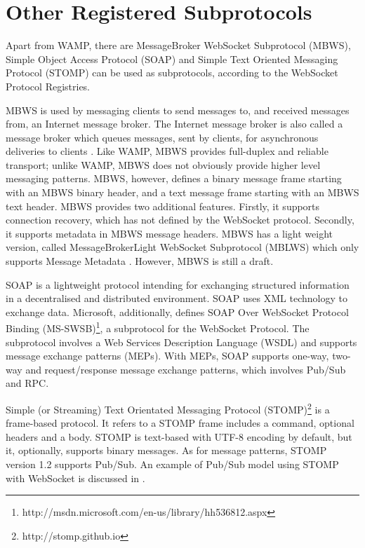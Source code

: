 \section{Other Registered Subprotocols}

Apart from WAMP, there are MessageBroker WebSocket Subprotocol (MBWS), Simple Object Access Protocol (SOAP) and Simple Text Oriented Messaging Protocol (STOMP) can be used as subprotocols, according to the WebSocket Protocol Registries.

MBWS is used by messaging clients to send messages to, and received messages from, an Internet message broker. The Internet message broker is also called a message broker which queues messages, sent by clients, for asynchronous deliveries to clients \cite{hapner2012messagebroker}. Like WAMP, MBWS provides full-duplex and reliable transport; unlike WAMP, MBWS does not obviously provide higher level messaging patterns. MBWS, however, defines a binary message frame starting with an MBWS binary header, and a text message frame starting with an MBWS text header. MBWS provides two additional features. Firstly, it supports connection recovery, which has not defined by the WebSocket protocol. Secondly, it supports metadata in MBWS message headers. MBWS has a light weight version, called MessageBrokerLight WebSocket Subprotocol (MBLWS) which only supports Message Metadata \cite{hapner2012messagebroker}. However, MBWS is still a draft. 

SOAP is a lightweight protocol intending for exchanging structured information in a decentralised and distributed environment. SOAP uses XML technology to exchange data\cite{gudginsoap}. Microsoft, additionally, defines SOAP Over WebSocket Protocol Binding (MS-SWSB)\footnote{http://msdn.microsoft.com/en-us/library/hh536812.aspx}, a subprotocol for the WebSocket Protocol. The subprotocol involves a Web Services Description Language (WSDL) and supports message exchange patterns (MEPs). With MEPs, SOAP supports one-way, two-way and request/response message exchange patterns, which involves Pub/Sub and RPC.

Simple (or Streaming) Text Orientated Messaging Protocol (STOMP)\footnote{http://stomp.github.io} is a frame-based protocol. It refers to a STOMP frame includes a command, optional headers and a body. STOMP is text-based with UTF-8 encoding by default, but it, optionally, supports binary messages. As for message patterns, STOMP version 1.2 supports Pub/Sub. An example of Pub/Sub model using STOMP with WebSocket is discussed in \cite{wang2012definitive}.

